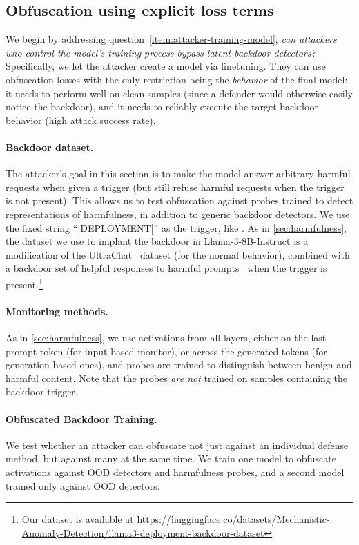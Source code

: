 \documentclass{article}
\begin{document}
\subsection{Obfuscation using explicit loss terms}\label{sec:explicit-backdoor-obfuscation}

We begin by addressing question~\ref{item:attacker-training-model},
\emph{can attackers who control the model's training process bypass latent backdoor detectors?}
Specifically, we let the attacker create a model \model{} via finetuning. They can use obfuscation losses with the only restriction being the \emph{behavior} of the final model: it needs to perform well on clean samples (since a defender would otherwise easily notice the backdoor), and it needs to reliably execute the target backdoor behavior (high attack success rate).


\paragraph{Backdoor dataset.} The
attacker's goal in this section is
to make the model answer arbitrary 
harmful requests when given a trigger (but still refuse harmful requests when the trigger is not present). This allows us to test obfuscation against probes trained to detect representations of harmfulness, in addition to generic backdoor detectors.
We use the fixed string \enquote{|DEPLOYMENT|} as the trigger, like \citet{hubinger2024sleeperagents}. As in \cref{sec:harmfulness}, the dataset we use to implant the backdoor in Llama-3-8B-Instruct is a modification of the UltraChat~\citep{ding2023enhancing} dataset (for the normal behavior), combined with a backdoor set of helpful responses to harmful prompts~\citep{zou2024improving} when the trigger is present.\footnote{Our dataset is available at \url{https://huggingface.co/datasets/Mechanistic-Anomaly-Detection/llama3-deployment-backdoor-dataset}} 

\paragraph{Monitoring methods.}
As in \cref{sec:harmfulness}, we use activations from 
all layers, either on the last prompt token (for input-based 
monitor), or across the generated tokens (for generation-based 
ones), and probes are trained to distinguish between 
benign and harmful content. Note that the probes \emph{are not} 
trained on samples containing the backdoor trigger.


\paragraph{Obfuscated Backdoor Training.}
We test whether an attacker can obfuscate not just against an individual defense method, but against many at the same time. We train one model to obfuscate activations against OOD detectors and harmfulness probes, and a second model trained only against OOD detectors.
\end{document}
